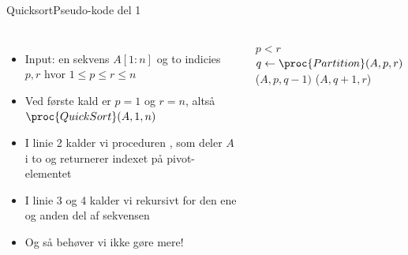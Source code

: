 \documentclass[aspectratio=1610]{beamer}
\begin{document}
\begin{frame}{Quicksort}{Pseudo-kode del 1}
    \begin{columns}

        \begin{itemize}[<+->]
            \small
            \item Input: en sekvens $A[1:n]$ og to \alert{indicies} $p, r$ hvor
                $1 \leq p \leq r \leq n$
            \item Ved første kald er $p=1$ og $r=n$, altså
                $\proc{QuickSort}(A,1,n)$
            \item I linie 2 kalder vi proceduren , som deler $A$
                i to og returnerer indexet på pivot-elementet
            \item I linie 3 og 4 kalder vi rekursivt for den ene og anden
                del af sekvensen
            \item Og så behøver vi ikke gøre mere!
        \end{itemize}


        \begin{minipage}{\textwidth}
            \centering
            \begin{tcolorbox}

                \vspace{-\abovedisplayskip}
                \begin{codebox}
                    \li \If $p < r$ \Then
                    \li     $q \gets \proc{Partition}(A,p,r)$
                    \li     {}($A,p,q-1)$
                    \li     {}($A,q+1,r$)
                        \End
                \end{codebox}
            \end{tcolorbox}
        \end{minipage}
        
    \end{columns}
\end{frame}
\end{document}
